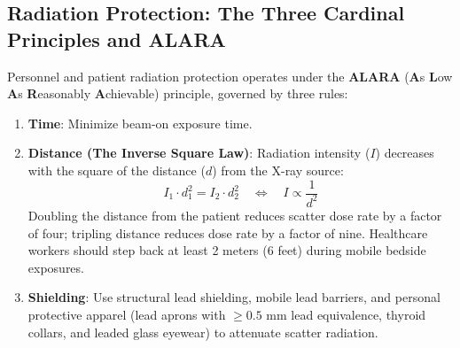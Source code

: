 \documentclass[11pt,a4paper]{article}
\begin{document}
\subsection{Radiation Protection: The Three Cardinal Principles and ALARA}
Personnel and patient radiation protection operates under the \textbf{ALARA} (\textbf{A}s \textbf{L}ow \textbf{A}s \textbf{R}easonably \textbf{A}chievable) principle, governed by three rules:
\begin{enumerate}
    \item \textbf{Time}: Minimize beam-on exposure time.
    \item \textbf{Distance (The Inverse Square Law)}: Radiation intensity ($I$) decreases with the square of the distance ($d$) from the X-ray source:
    \begin{equation}
        I_1 \cdot d_1^2 = I_2 \cdot d_2^2 \quad \iff \quad I \propto \frac{1}{d^2}
    \end{equation}
    Doubling the distance from the patient reduces scatter dose rate by a factor of four; tripling distance reduces dose rate by a factor of nine. Healthcare workers should step back at least 2 meters (6 feet) during mobile bedside exposures.
    \item \textbf{Shielding}: Use structural lead shielding, mobile lead barriers, and personal protective apparel (lead aprons with $\ge 0.5\text{ mm}$ lead equivalence, thyroid collars, and leaded glass eyewear) to attenuate scatter radiation.
\end{enumerate}
\end{document}
